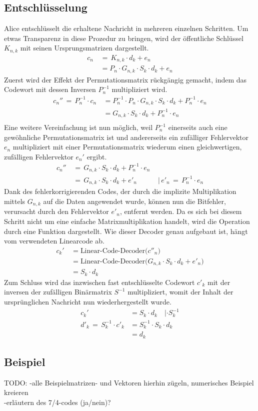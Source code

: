 \subsection{Entschlüsselung
\label{mceliece:section:entschl}}
Alice entschlüsselt die erhaltene Nachricht in mehreren einzelnen Schritten.
Um etwas Transparenz in diese Prozedur zu bringen, wird der öffentliche Schlüssel $K_{n,k}$ mit seinen Ursprungsmatrizen dargestellt.
\begin{align*}
    c_n\,&=\,K_{n,k}\cdot d_k + e_n \\
    &= P_{n}\cdot G_{n,k}\cdot S_{k}\cdot d_k + e_n
\end{align*}
Zuerst wird der Effekt der Permutationsmatrix rückgängig gemacht,
indem das Codewort mit dessen Inversen $P_n^{-1}$ multipliziert wird.
\begin{align*}
    c_{n}''\,=\,P_n^{-1}\cdot c_n\,&= P_n^{-1}\cdot P_{n}\cdot G_{n,k}\cdot S_{k}\cdot d_k + P_n^{-1}\cdot e_n \\
                                         &= G_{n,k}\cdot S_{k}\cdot d_k + P_n^{-1}\cdot e_n \\
\end{align*}
Eine weitere Vereinfachung ist nun möglich,
weil $P_n^{-1}$ einerseits auch eine gewöhnliche Permutationsmatrix ist
und andererseits ein zufälliger Fehlervektor $e_n$ multipliziert mit einer Permutationsmatrix
wiederum einen gleichwertigen, zufälligen Fehlervektor $e_n'$ ergibt.
\begin{align*}
    c_{n}''\,&=\,G_{n,k}\cdot S_{k}\cdot d_k + P_n^{-1}\cdot e_n \\
             &=\,G_{n,k}\cdot S_{k}\cdot d_k + e'_n\quad \quad \quad | \,
    e'_n\,=\,P_n^{-1}\cdot e_n
\end{align*}
Dank des fehlerkorrigierenden Codes, der durch die implizite Multiplikation mittels $G_{n,k}$ auf die Daten angewendet wurde,
können nun die Bitfehler, verursacht durch den Fehlervektor $e'_n$,
entfernt werden.
Da es sich bei diesem Schritt nicht um eine einfache Matrixmultiplikation handelt,
wird die Operation durch eine Funktion dargestellt.
Wie dieser Decoder genau aufgebaut ist,
hängt vom verwendeten Linearcode ab.
\begin{align*}
    c_{k}'\,&=\text{Linear-Code-Decoder($c''_n$)}\\
            &=\text{Linear-Code-Decoder($G_{n,k}\cdot S_{k}\cdot d_k + e'_n$)}\\
            &=S_{k}\cdot d_k
\end{align*}
Zum Schluss wird das inzwischen fast entschlüsselte Codewort $c'_k$ mit der inversen der zufälligen Binärmatrix $S^{-1}$ multipliziert,
womit der Inhalt der ursprünglichen Nachricht nun wiederhergestellt wurde.
\begin{align*}
                            c_{k}'\,&=S_{k}\cdot d_k \quad | \cdot S_k^{-1}\\
    d'_{k}\,=\,S_{k}^{-1} \cdot c'_k&=S_{k}^{-1} \cdot S_{k}\cdot d_k\\
                                    &=d_k
\end{align*}

\subsection{Beispiel}

TODO:
-alle Beispielmatrizen- und Vektoren hierhin zügeln, numerisches Beispiel kreieren\\
-erläutern des 7/4-codes (ja/nein)?